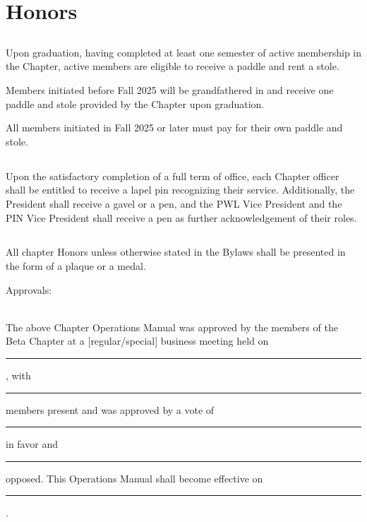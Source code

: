 \documentclass[10pt, oneside]{article}
\begin{document}
\section{Honors}
\subsection{}
Upon graduation, having completed at least one semester of active membership in the Chapter, active members are eligible to receive a paddle and rent a stole.

Members initiated before Fall 2025 will be grandfathered in and receive one paddle and stole provided by the Chapter upon graduation.

All members initiated in Fall 2025 or later must pay for their own paddle and stole.
\subsection{}
Upon the satisfactory completion of a full term of office, each Chapter officer shall be entitled to receive a lapel pin recognizing their service. Additionally, the President shall receive a gavel or a pen, and the PWL Vice President and the PIN Vice President shall receive a pen as further acknowledgement of their roles.

\subsection{}
All chapter Honors unless otherwise stated in the Bylaws shall be presented in the form of a plaque or a medal.

\clearpage

{\normalfont\Large \centering Approvals: \\~\\}

\noindent The above Chapter Operations Manual was approved by the members of the Beta
Chapter at a [regular/special] business meeting held on \rule{4cm}{0.4pt}, with \rule{1cm}{0.4pt} members present and was approved by a vote of \rule{1cm}{0.4pt} in favor and \rule{1cm}{0.4pt} opposed. This Operations Manual shall become effective on \rule{4cm}{0.4pt}.
\\[2\baselineskip]
\end{document}
